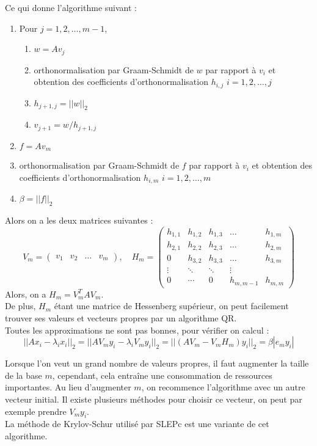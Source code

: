 Ce qui donne l'algorithme suivant :
\begin{enumerate}
\item Pour $j=1,2,\dots,m-1$,
\begin{enumerate}
\item $w=Av_j$
\item orthonormalisation par Graam-Schmidt de $w$ par rapport à $v_i$ et obtention des coefficients d'orthonormalisation $h_{i,j}$ $i=1,2,\dots,j$
\item $h_{j+1,j}=||w||_2$
\item $v_{j+1}=w/h_{j+1,j}$
\end{enumerate}
\item $f=Av_m$
\item orthonormalisation par Graam-Schmidt de $f$ par rapport à $v_i$ et obtention des coefficients d'orthonormalisation $h_{i,m}$ $i=1,2,\dots,m$
\item $\beta=||f||_2$
\end{enumerate}

Alors on a les deux matrices suivantes :
\[ V_m = \begin{pmatrix} v_1 & v_2 & \dots & v_m \end{pmatrix},\quad H_m=\begin{pmatrix} h_{1,1} & h_{1,2} & h_{1,3} & \dots & h_{1,m}\\
h_{2,1} & h_{2,2} & h_{2,3} & \dots & h_{2,m} \\
0 & h_{3,2} & h_{3,3} & \dots & h_{3,m}\\
\vdots & \ddots & \ddots & \vdots\\
0 & \cdots & 0 & h_{m,m-1} & h_{m,m} \end{pmatrix} \]
Alors, on a $H_m=V_m^TAV_m$.\\
De plus, $H_m$ étant une matrice de Hessenberg supérieur, on peut facilement trouver ses valeurs et vecteurs propres par un algorithme QR.\\

Toutes les approximations ne sont pas bonnes, pour vérifier on calcul :
\[ ||Ax_i-\lambda_ix_i||_2 = ||AV_my_i-\lambda_iV_my_i||_2 = ||(AV_m-V_mH_m)y_i||_2 = \beta|e_my_i| \]

Lorsque l'on veut un grand nombre de valeurs propres, il faut augmenter la taille de la base $m$, cependant, cela entraîne une consommation de ressources importantes. Au lieu d'augmenter $m$, on recommence l'algorithme avec un autre vecteur initial. Il existe plusieurs méthodes pour choisir ce vecteur, on peut par exemple prendre $V_my_i$.\\

La méthode de Krylov-Schur utilisé par SLEPc est une variante de cet algorithme.

